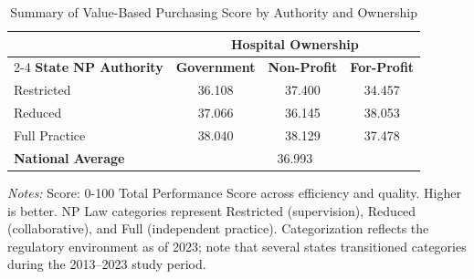 \begin{table}[htbp]
    \centering
    \caption{Summary of Value-Based Purchasing Score by Authority and Ownership}
    \label{tab:hvbp_tps_score}
    \vspace{0.2cm}
    \begin{tabular}{lccc}
        \toprule
        & \multicolumn{3}{c}{\textbf{Hospital Ownership}} \\
        \cmidrule(lr){2-4}
        \textbf{State NP Authority} & \textbf{Government} & \textbf{Non-Profit} & \textbf{For-Profit} \\
        \midrule
        Restricted & 36.108 & 37.400 & 34.457 \\
        Reduced & 37.066 & 36.145 & 38.053 \\
        Full Practice & 38.040 & 38.129 & 37.478 \\
        \midrule
        \textbf{National Average} & \multicolumn{3}{c}{36.993} \\
        \bottomrule
    \end{tabular}
    \vspace{0.1cm}
    \begin{minipage}{0.85\textwidth}
        \footnotesize \textit{Notes:} Score: 0-100 Total Performance Score across efficiency and quality. Higher is better. NP Law categories represent Restricted (supervision), Reduced (collaborative), and Full (independent practice). Categorization reflects the regulatory environment as of 2023; note that several states transitioned categories during the 2013--2023 study period.
    \end{minipage}
\end{table}